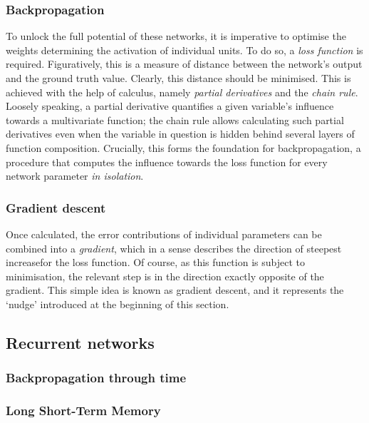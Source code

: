 \documentclass[../../report.tex]{subfiles}
\begin{document}
\subsubsection{Backpropagation}
To unlock the full potential of these networks, it is imperative to optimise the
weights determining the activation of individual units. To do so, a \emph{loss
function} is required. Figuratively, this is a measure of distance between the
network's output and the ground truth value. Clearly, this distance should be
minimised. This is achieved with the help of calculus, namely \emph{partial
derivatives} and the \emph{chain rule}. Loosely speaking, a partial derivative
quantifies a given variable's influence towards a multivariate function; the
chain rule allows calculating such partial derivatives even when the variable in
question is hidden behind several layers of function composition. Crucially,
this forms the foundation for backpropagation, a procedure that computes the
influence towards the loss function for every network parameter \emph{in
isolation}.

\subsubsection{Gradient descent}

Once calculated, the error contributions of individual parameters can be
combined into a \emph{gradient}, which in a sense describes the direction of
steepest increase\footnotemark for the loss function. Of course, as this
function is subject to minimisation, the relevant step is in the direction
exactly opposite of the gradient. This simple idea is known as gradient descent,
and it represents the `nudge' introduced at the beginning of this section.



\subsection{Recurrent networks}


\subsubsection{Backpropagation through time}


\subsubsection{Long Short-Term Memory}

\end{document}
